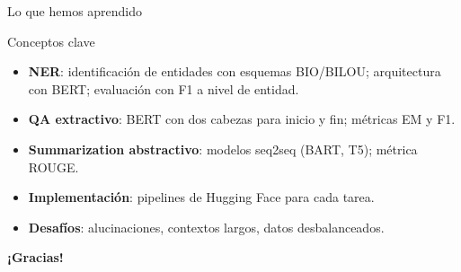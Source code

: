 \documentclass[aspectratio=169, 10pt, xcolor=table]{beamer}
\begin{document}
\begin{frame}{Lo que hemos aprendido}
    \begin{exampleblock}{Conceptos clave}
        \begin{itemize}
            \item \textbf{NER}: identificación de entidades con esquemas BIO/BILOU; arquitectura con BERT; evaluación con F1 a nivel de entidad.
            \item \textbf{QA extractivo}: BERT con dos cabezas para inicio y fin; métricas EM y F1.
            \item \textbf{Summarization abstractivo}: modelos seq2seq (BART, T5); métrica ROUGE.
            \item \textbf{Implementación}: pipelines de Hugging Face para cada tarea.
            \item \textbf{Desafíos}: alucinaciones, contextos largos, datos desbalanceados.
        \end{itemize}
    \end{exampleblock}
\end{frame}

\begin{frame}
    \centering
    \Huge \textbf{¡Gracias!}

\end{frame}
\end{document}
